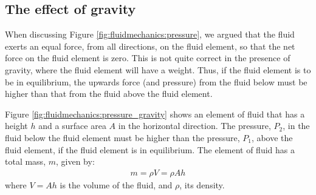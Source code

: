 \subsection{The effect of gravity}
When discussing Figure \ref{fig:fluidmechanics:pressure}, we argued that the fluid exerts an equal force, from all directions, on the fluid element, so that the net force on the fluid element is zero. This is not quite correct in the presence of gravity, where the fluid element will have a weight. Thus, if the fluid element is to be in equilibrium, the upwards force (and pressure) from the fluid below must be higher than that from the fluid above the fluid element. 

Figure \ref{fig:fluidmechanics:pressure_gravity} shows an element of fluid that has a height $h$ and a surface area $A$ in the horizontal direction. The pressure, $P_2$, in the fluid below the fluid element must be higher than the pressure, $P_1$, above the fluid element, if the fluid element is in equilibrium.
The element of fluid has a total mass, $m$, given by:
\begin{align*}
m = \rho V = \rho Ah
\end{align*}
where $V=Ah$ is the volume of the fluid, and $\rho$, its density.

